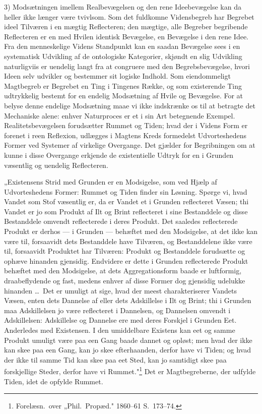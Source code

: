 \documentclass[12pt]{book}
\newcommand{\opage}[1]{\marginnote{\footnotesize\textit{[#1]}}}
\begin{document}
3) Modsætningen imellem Realbevægelsen og den rene Ideebevægelse kan da heller ikke længer være
tvivlsom. Som det fuldkomne Vidensbegreb har Begrebet ideel Tilværen i en mægtig Reflecteren; den
mægtige, alle Begreber begribende Reflecteren er en med Hvilen identisk Bevægelse, en Bevægelse i
den rene Idee. Fra den menneskelige Videns Standpunkt
\opage{206} kan en saadan Bevægelse sees i en systematisk Udvikling af de ontologiske Kategorier, skjøndt en
slig Udvikling naturligviis er uendelig langt fra at congruere med den Begrebsbevægelse, hvori Ideen
selv udvikler og bestemmer sit logiske Indhold. Som eiendommeligt Magtbegreb er Begrebet en Ting i
Tingenes Række, og som existerende Ting udtrykkelig bestemt for en endelig Modsætning af Hvile og
Bevægelse. For at belyse denne endelige Modsætning maae vi ikke indskrænke os til at betragte det
Mechaniske alene: enhver Naturproces er et i sin Art betegnende Exempel. Realitetsbevægelsen
forudsætter Rummet og Tiden; hvad der i Videns Form er forenet i reen Reflexion, udlægges i Magtens
Kreds formedelst Udvorteshedens Former ved Systemer af virkelige Overgange. Det gjælder for
Begribningen om at kunne i disse Overgange erkjende de existentielle Udtryk for en i Grunden
væsentlig og uendelig Reflecteren.

„Existensens Strid med Grunden er en Modsigelse, som ved Hjælp af Udvorteshedens Former: Rummet og
Tiden finder sin Løsning. Spørge vi, hvad Vandet som Stof væsentlig er, da er Vandet et i Grunden
reflecteret Væsen; thi Vandet er jo som Produkt af Ilt og Brint reflecteret i sine Bestanddele og
disse Bestanddele omvendt reflecterede i deres Produkt. Det saaledes reflecterede Produkt er derhos
--- i Grunden --- behæftet med den Modsigelse, at det ikke kan være til, forsaavidt dets
Bestanddele have Tilværen, og Bestanddelene ikke være til, forsaavidt Produktet har Tilværen:
Produkt og Bestanddele forudsætte og ophæve hinanden gjensidig. Endvidere er dette i Grunden
reflecterede Produkt behæftet med den Modsigelse, at dets Aggregationsform baade er luftformig,
draabeflydende og fast, medens enhver af disse Former dog gjensidig udelukke hinanden \dots\ Det er
umuligt at sige, hvad der meest charakteriserer Vandets Væsen, enten dets Dannelse af eller dets
Adskillelse i Ilt og Brint; thi i Grunden maa Adskillelsen jo være reflecteret i Dannelsen, og
Dannelsen omvendt i Adskillelsen: Adskillelse og Dannelse ere med deres Forskjel i
\opage{207} Grunden Eet. Anderledes med Existensen. I den umiddelbare Existens kan eet og samme Produkt umuligt
være paa een Gang baade dannet og opløst; men hvad der ikke kan skee paa een Gang, kan jo skee
efterhaanden, derfor have vi Tiden; og hvad der ikke til samme Tid kan skee paa eet Sted, kan jo
samtidigt skee paa forskjellige Steder, derfor have vi Rummet."\footnote{Forelæsn.\ over „Phil.\
Propæd." 1860--61 S.~173--74.} Det er Magtbegreberne, der udfylde Tiden, idet de opfylde Rummet.
\end{document}
